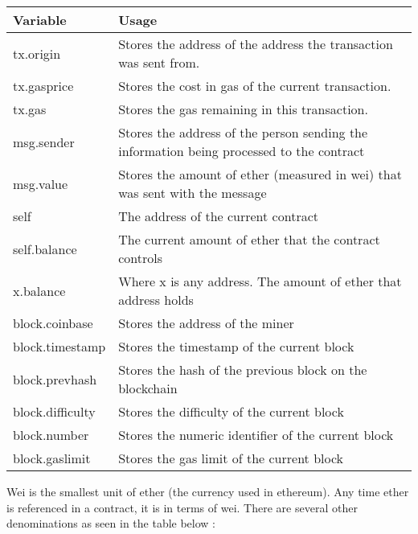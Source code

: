 \documentclass[12pt]{article}
\begin{document}
\begin{center}
	\begin{tabular}{| l | p{9cm} |}
	\hline
	Variable & Usage \\ \hline
	tx.origin & Stores the address of the address the transaction was sent from. \\ \hline
	tx.gasprice & Stores the cost in gas of the current transaction. \\ \hline	
	tx.gas & Stores the gas remaining in this transaction. \\ \hline
	msg.sender & Stores the address of the person sending the information being processed to the contract \\ \hline
	msg.value & Stores the amount of ether (measured in wei) that was sent with the message \\ \hline
	self & The address of the current contract \\ \hline
	self.balance & The current amount of ether that the contract controls \\ \hline
	x.balance & Where x is any address. The amount of ether that address holds \\ \hline
	block.coinbase & Stores the address of the miner \\ \hline
	block.timestamp & Stores the timestamp of the current block \\ \hline
	block.prevhash & Stores the hash of the previous block on the blockchain \\ \hline
	block.difficulty & Stores the difficulty of the current block \\ \hline
	block.number & Stores the numeric identifier of the current block \\ \hline
	block.gaslimit & Stores the gas limit of the current block \\ \hline
	\end{tabular}
\end{center}

Wei is the smallest unit of ether (the currency used in ethereum). Any time ether is referenced in a contract, it is in terms of wei. There are several other denominations as seen in the table below \cite{Ether.fund}: 
\end{document}
